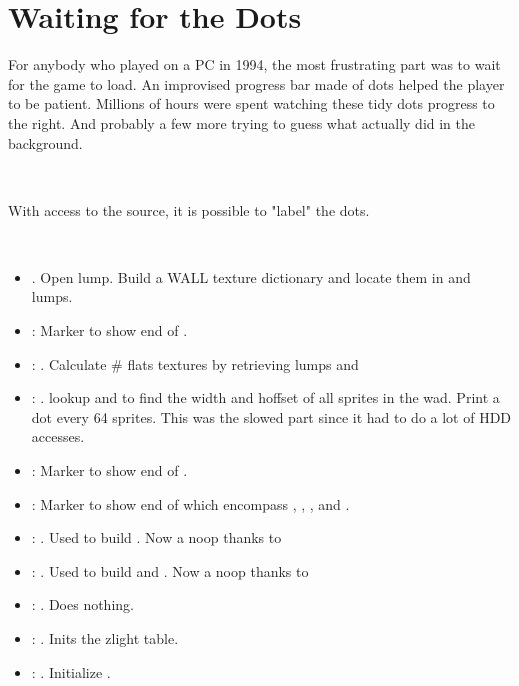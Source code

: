 \section{Waiting for the Dots}
\label{dots_explained}
For anybody who played \doom{} on a PC in 1994, the most frustrating part was to wait for the game to load. An improvised progress bar made of dots helped the player to be patient. Millions of hours were spent watching these tidy dots progress to the right. And probably a few more trying to guess what  actually did in the background.\\
\par
{}\\
\par
With access to the source, it is possible to "label" the dots.\\
\par
{}\\
\par
{}
\par
\begin{itemize}
\item {} . Open  lump. Build a WALL texture dictionary and locate them in  and  lumps.
\item {}: Marker to show end of .
\item {}: . Calculate \# flats textures by retrieving lumps  and 
\item {}: . lookup  and  to find the width and hoffset of all sprites in the wad. Print a dot every 64 sprites. This was the slowed part since it had to do a lot of HDD accesses.
\item {}: Marker to show end of . 
\item {}: Marker to show end of  which encompass  , , , and .
\item {}: . Used to build . Now a noop thanks to 
\item {}: . Used to build  and . Now a noop thanks to 
\item {}: . Does nothing. 
\item {}: . Inits the zlight table.
\item {}: . Initialize .
\end{itemize}

